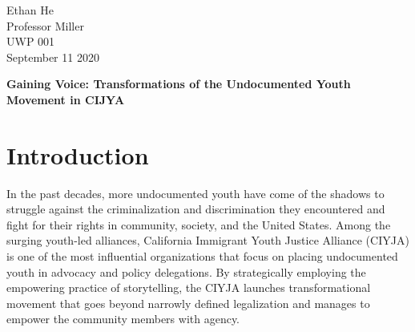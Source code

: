 \documentclass[12pt]{article}
\begin{document}
\begin{flushleft}

Ethan He \\
Professor Miller \\
UWP 001 \\
September 11 2020 \\

\begin{center}
    \textbf{Gaining Voice: Transformations of the Undocumented Youth Movement in CIJYA}
\end{center}

\setlength{\parindent}{0.5in}


\section*{Introduction}

In the past decades, more undocumented youth have come of the shadows to struggle against the criminalization and discrimination they encountered and fight for their rights in community, society, and the United States. 
Among the surging youth-led alliances, California Immigrant Youth Justice Alliance (CIYJA) is one of the most influential organizations that focus on placing undocumented youth in advocacy and policy delegations. 
By strategically employing the empowering practice of storytelling, the CIYJA launches transformational movement that goes beyond narrowly defined legalization and manages to empower the community members with agency.


\end{flushleft}
\end{document}
